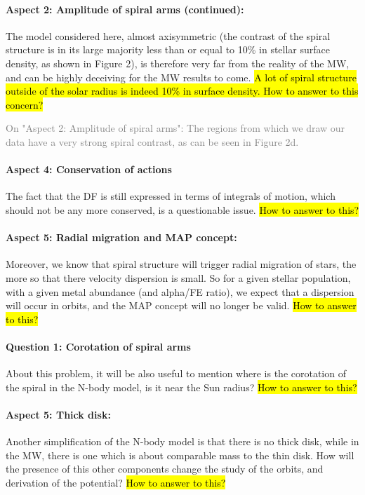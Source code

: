 \documentclass[10pt,a4paper]{article}
\newcommand{\Answer}[1]{\textcolor{Gray}{#1}}
\begin{document}
\paragraph{Aspect 2: Amplitude of spiral arms (continued):} The model considered here, almost axisymmetric (the contrast of the spiral structure is in its large majority less than or equal to 10\% in stellar surface density, as shown in Figure 2),  is therefore very far from the reality of the MW, and can be highly deceiving for the MW results to come. \hl{A lot of spiral structure outside of the solar radius is indeed 10\% in surface density. How to answer to this concern?}

\Answer{On "Aspect 2: Amplitude of spiral arms": The regions from which we draw our data have a very strong spiral contrast, as can be seen in Figure 2d.}

\paragraph{Aspect 4: Conservation of actions} The fact that the DF is still expressed in terms of integrals of motion, which should not be any more conserved, is a questionable issue. \hl{How to answer to this?}

\paragraph{Aspect 5: Radial migration and MAP concept:} Moreover, we know that spiral structure will trigger radial migration of stars, the
more so that there velocity dispersion is small. So for a given stellar population,
with a given metal abundance (and alpha/FE ratio), we expect that a dispersion will
occur in orbits, and the MAP concept will no longer be valid. \hl{How to answer to this?}

\paragraph{Question 1: Corotation of spiral arms} About this problem, it will be also useful to mention where is the corotation of the
spiral in the N-body model, is it near the Sun radius? \hl{How to answer to this?}

\paragraph{Aspect 5: Thick disk:} Another simplification of the N-body model is that there is no thick disk, while in
the MW, there is one which is about comparable mass to the thin disk. How will the
presence of this other components change the study of the orbits, and derivation of
the potential? \hl{How to answer to this?} 
\end{document}
